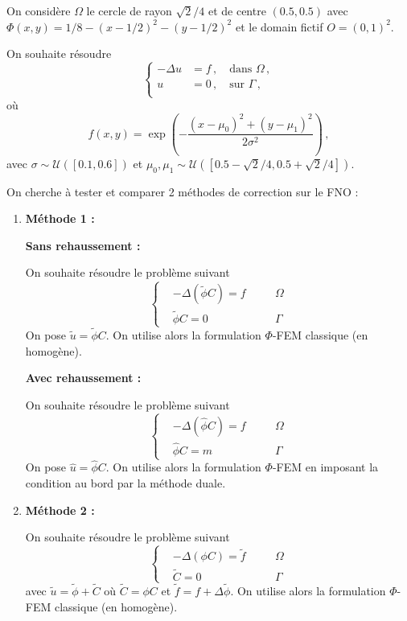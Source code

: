 On considère $\Omega$ le cercle de rayon $\sqrt{2}/4$ et de centre $(0.5,0.5)$ avec $\Phi(x,y)=1/8-(x-1/2)^2-(y-1/2)^2$ et le domain fictif $O=(0,1)^2$.

On souhaite résoudre 
\begin{equation*}
	\begin{cases}
		-\Delta u &= f\,, \quad \text{dans $\Omega$}\,, \\
		u &= 0\,, \quad \text{sur $\Gamma$}\,, \\
	\end{cases}
\end{equation*}
où 
$$f(x,y) = \exp\left(-\frac{(x-\mu_0)^2 + (y-\mu_1)^2}{2\sigma^2}\right)\,, $$ 
avec $\sigma \sim \mathcal{U}([0.1,0.6])$ et $\mu_0, \mu_1 \sim \mathcal{U}([0.5-\sqrt{2}/4, 0.5+\sqrt{2}/4])$.

On cherche à tester et comparer 2 méthodes de correction sur le FNO :

\begin{enumerate}[label=\textbullet]
	
	\item \textbf{Méthode 1 :}
	
	\textbf{Sans rehaussement :}
	
	On souhaite résoudre le problème suivant
	$$\left\{\begin{aligned}
		&-\Delta (\tilde{\phi}C)=f \quad &&\Omega \\
		&\tilde{\phi}C=0 \quad &&\Gamma
	\end{aligned}\right.$$
	On pose $\tilde{u}=\tilde{\phi}C$.
	On utilise alors la formulation $\Phi$-FEM classique (en homogène).
	
	\textbf{Avec rehaussement :}
	
	On souhaite résoudre le problème suivant
	$$\left\{\begin{aligned}
		&-\Delta (\hat{\phi}C)=f \quad &&\Omega \\
		&\hat{\phi}C=m \quad &&\Gamma
	\end{aligned}\right.$$
	On pose $\hat{u}=\hat{\phi}C$.
	On utilise alors la formulation $\Phi$-FEM en imposant la condition au bord par la méthode duale.
	
	\item \textbf{Méthode 2 :}
	
	On souhaite résoudre le problème suivant
	$$\left\{\begin{aligned}
		&-\Delta(\phi C)=\tilde{f} \quad &&\Omega \\
		&\tilde{C}=0 \quad &&\Gamma
	\end{aligned}\right.$$
	avec $\tilde{u}=\tilde{\phi}+\tilde{C}$ où $\tilde{C}=\phi C$ et $\tilde{f}=f+\Delta\tilde{\phi}$.
	On utilise alors la formulation $\Phi$-FEM classique (en homogène).
	
\end{enumerate}


